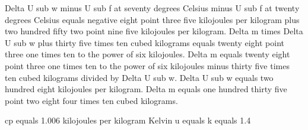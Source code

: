 Delta U sub w minus U sub f at seventy degrees Celsius minus U sub f at twenty degrees Celsius equals negative eight point three five kilojoules per kilogram plus two hundred fifty two point nine five kilojoules per kilogram.  
Delta m times Delta U sub w plus thirty five times ten cubed kilograms equals twenty eight point three one times ten to the power of six kilojoules.  
Delta m equals twenty eight point three one times ten to the power of six kilojoules minus thirty five times ten cubed kilograms divided by Delta U sub w.  
Delta U sub w equals two hundred eight kilojoules per kilogram.  
Delta m equals one hundred thirty five point two eight four times ten cubed kilograms.

cp equals 1.006 kilojoules per kilogram Kelvin  
u equals k equals 1.4